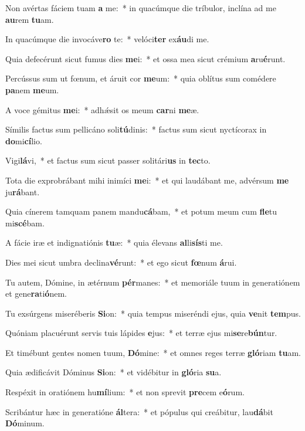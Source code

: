 \item Non avértas fáciem tuam \textbf{a} me:~* in quacúmque die tríbulor, inclína ad me \textbf{au}rem \textbf{tu}am.
\item In quacúmque die invocáve\textbf{ro} te:~* velóci\textbf{ter} ex\textbf{áu}di me.
\item Quia defecérunt sicut fumus dies \textbf{me}i:~* et ossa mea sicut crémium \textbf{a}ru\textbf{é}runt.
\item Percússus sum ut fœnum, et áruit cor \textbf{me}um:~* quia oblítus sum comédere \textbf{pa}nem \textbf{me}um.
\item A voce gémitus \textbf{me}i:~* adhǽsit os meum \textbf{car}ni \textbf{me}æ.
\item Símilis factus sum pellicáno soli\textbf{tú}dinis:~* factus sum sicut nyctícorax in \textbf{do}mi\textbf{cí}lio.
\item Vigi\textbf{lá}vi,~* et factus sum sicut passer solitári\textbf{us} in \textbf{tec}to.
\item Tota die exprobrábant mihi inimíci \textbf{me}i:~* et qui laudábant me, advérsum \textbf{me} ju\textbf{rá}bant.
\item Quia cínerem tamquam panem mandu\textbf{cá}bam,~* et potum meum cum \textbf{fle}tu mi\textbf{scé}bam.
\item A fácie iræ et indignatiónis \textbf{tu}æ:~* quia élevans \textbf{al}li\textbf{sís}ti me.
\item Dies mei sicut umbra declina\textbf{vé}runt:~* et ego sicut \textbf{fœ}num \textbf{á}rui.
\item Tu autem, Dómine, in ætérnum \textbf{pér}manes:~* et memoriále tuum in generatiónem et gene\textbf{ra}ti\textbf{ó}nem.
\item Tu exsúrgens miseréberis \textbf{Si}on:~* quia tempus miseréndi ejus, quia \textbf{ve}nit \textbf{tem}pus.
\item Quóniam placuérunt servis tuis lápides \textbf{e}jus:~* et terræ ejus mi\textbf{se}re\textbf{bún}tur.
\item Et timébunt gentes nomen tuum, \textbf{Dó}mine:~* et omnes reges terræ \textbf{gló}riam \textbf{tu}am.
\item Quia ædificávit Dóminus \textbf{Si}on:~* et vidébitur in \textbf{gló}ria \textbf{su}a.
\item Respéxit in oratiónem hu\textbf{mí}lium:~* et non sprevit \textbf{pre}cem e\textbf{ó}rum.
\item Scribántur hæc in generatióne \textbf{ál}tera:~* et pópulus qui creábitur, lau\textbf{dá}bit \textbf{Dó}minum.
